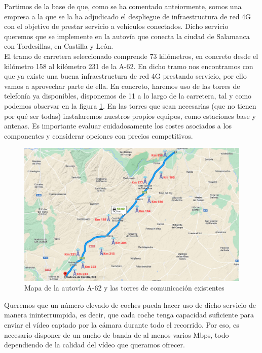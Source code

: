 Partimos de la base de que, como se ha comentado anteiormente, somos una empresa a la que se la ha adjudicado el despliegue de infraestructura de red 4G con el objetivo de prestar servicio a vehículos conectados. Dicho servicio queremos que se implemente en la autovía que conecta la ciudad de Salamanca con Tordesillas, en Castilla y León. \\

El tramo de carretera seleccionado comprende 73 kilómetros, en concreto desde el kilómetro 158 al kilómetro 231 de la A-62. En dicho tramo nos encontramos con que ya existe una buena infraestructura de red 4G prestando servicio, por ello vamos a aprovechar parte de ella. En concreto, haremos uso de las torres de telefonía ya disponibles, disponemos de 11 a lo largo de la carretera, tal y como podemos observar en la figura \ref{autovia}. En las torres que sean necesarias (que no tienen por qué ser todas) instalaremos nuestros propios equipos, como estaciones base y antenas. Es importante evaluar cuidadosamente los costes asociados a los componentes y considerar opciones con precios competitivos. \\


\begin{figure}[H]
    \centering
 	\includegraphics[width=\textwidth]{Imagenes/PlanteamientoInicial/torres_telefonia.pdf}
    \caption{Mapa de la autovía A-62 y las torres de comunicación existentes }
    \label{autovia}
\end{figure}

Queremos que un número elevado de coches pueda hacer uso de dicho servicio de manera ininterrumpida, es decir, que cada coche tenga capacidad suficiente para enviar el vídeo captado por la cámara durante todo el recorrido. Por eso, es necesario disponer de un ancho de banda de al menos varios Mbps, todo dependiendo de la calidad del vídeo que queramos ofrecer. \\

